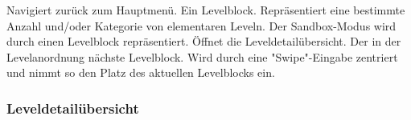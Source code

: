 \begin{center}
\setlength\fboxsep{20pt}
\setlength\fboxrule{1pt}
\end{center}

\begin{requirements}
 Navigiert zurück zum Hauptmenü.
 Ein Levelblock. Repräsentiert eine bestimmte Anzahl und/oder Kategorie von elementaren Leveln. Der Sandbox-Modus wird durch einen Levelblock repräsentiert. Öffnet die Leveldetailübersicht.
 Der in der Levelanordnung nächste Levelblock. Wird durch eine "Swipe"-Eingabe zentriert und nimmt so den Platz des aktuellen Levelblocks ein.
\end{requirements}

\subsubsection{Leveldetailübersicht}

\begin{center}
\setlength\fboxsep{20pt}
\setlength\fboxrule{1pt}
\end{center}

